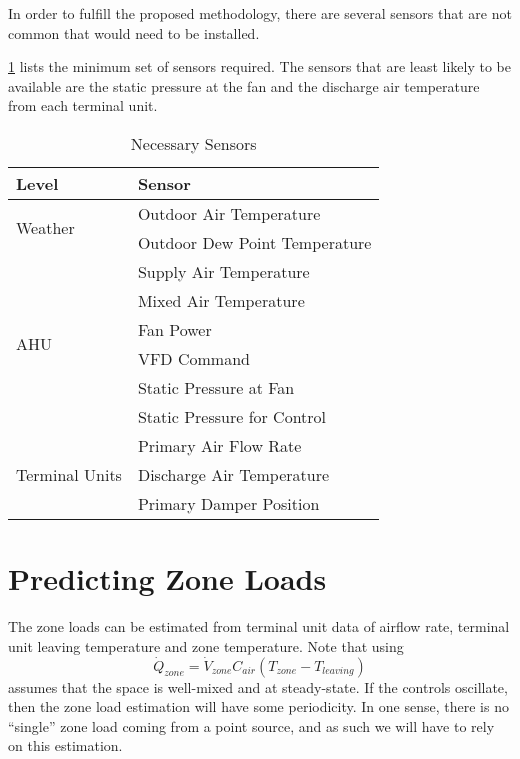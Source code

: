 In order to fulfill the proposed methodology, there are several sensors that
are not common that would need to be installed. 

\tableref{} \ref{tab:NecessarySensors} lists the minimum set of sensors
required. The sensors that are least likely to be available are the static
pressure at the fan and the discharge air temperature from each terminal
unit.

\begin{table}
\centering
\begin{tabular}{l l}
\toprule

Level & Sensor \\
\midrule\midrule
\multirow{2}{*}{Weather} & Outdoor Air Temperature \\
 & Outdoor Dew Point Temperature \\
 
 \midrule
 
\multirow{6}{*}{AHU}              & Supply Air Temperature      \\
                                  & Mixed Air Temperature       \\
                                  & Fan Power                   \\
                                  & VFD Command                 \\
                                  & Static Pressure at Fan      \\
                                  & Static Pressure for Control \\
\midrule
\multirow{4}{*}{Terminal Units}   & Primary Air Flow Rate       \\
                                  & Discharge Air Temperature   \\
                                  & Primary Damper Position     \\

\bottomrule

\end{tabular}
\caption{Necessary Sensors}
\label{tab:NecessarySensors}
\end{table}

\section{Predicting Zone Loads}

The zone loads can be estimated from terminal unit data of airflow rate,
terminal unit leaving temperature and zone temperature. Note that using 
%
\begin{equation}
\dot Q_{zone} = \dot V_{zone} C_{air} \left(T_{zone}-T_{leaving} \right)
\end{equation}
%
assumes that the space is well-mixed and at steady-state. If the controls
oscillate, then the zone load estimation will have some periodicity. In one
sense, there is no ``single'' zone load coming from a point source, and as such
we will have to rely on this estimation.

